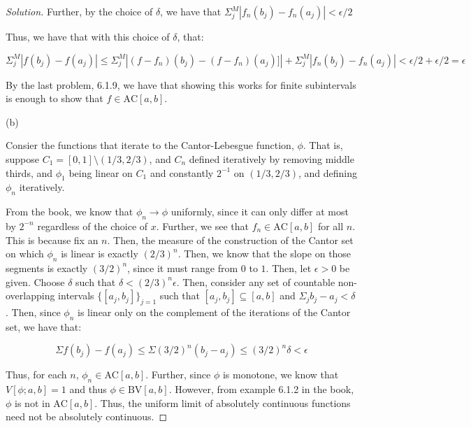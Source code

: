 \documentclass[10pt]{article}
\newcommand{\bv}{{\text{BV}}}
\newcommand{\ac}{{\text{AC}}}
\begin{document}
\begin{proof}[Solution]
Further, by the choice of $\delta$, we have that $ \Sigma_j^M | f_n(b_j) - f_n(a_j)|  < \epsilon/2$

Thus, we have that with this choice of $\delta$, that:

$$  \Sigma_j^M | f(b_j) - f(a_j) | \leq \Sigma_j^M | (f- f_n)(b_j) - (f - f_n)(a_j)]| + \Sigma_j^M | f_n(b_j) - f_n(a_j)|  < \epsilon/2 + \epsilon/2 = \epsilon $$

By the last problem, 6.1.9, we have that showing this works for finite subintervals is enough to show that $f \in \ac[a,b]$.

(b)

Consier the functions that iterate to the Cantor-Lebesgue function, $\phi$. That is, suppose $C_1 = [0,1] \setminus (1/3,2/3)$, and $C_n$ defined iteratively by removing middle thirds, and $\phi_1$ being linear on $C_1$ and constantly $2^{-1}$ on $(1/3,2/3)$, and defining $\phi_n$ iteratively.

From the book, we know that $\phi_n \to \phi$ uniformly, since it can only differ at most by $2^{-n}$ regardless of the choice of $x$. Further, we see that $f_n \in \ac[a,b]$ for all $n$. This is because fix an $n$. Then, the measure of the construction of the Cantor set on which $\phi_n$ is linear is exactly $(2/3)^n$. Then, we know that the slope on those segments is exactly $(3/2)^n$, since it must range from $0$ to $1$. Then, let $\epsilon > 0$ be given. Choose $\delta$ such that $\delta < (2/3)^n \epsilon$. Then, consider any set of countable non-overlapping intervals  $\{ [a_j, b_j] \}_{j=1}$ such that $[a_j,b_j] \subseteq [a,b]$ and $\Sigma_j b_j - a_j < \delta$. Then, since $\phi_n$ is linear only on the complement of the iterations of the Cantor set, we have that:

$$ \Sigma f(b_j) - f(a_j) \leq \Sigma (3/2)^n (b_j - a_j) \leq (3/2)^n \delta  < \epsilon $$

Thus, for each $n$, $\phi_n \in \ac[a,b]$. Further, since $\phi$ is monotone, we know that $V[\phi;a,b] = 1$ and thus $\phi \in \bv[a,b]$. However, from example 6.1.2 in the book, $\phi$ is not in $\ac[a,b]$. Thus, the uniform limit of absolutely continuous functions need not be absolutely continuous.



\end{proof}

 
\end{document}

